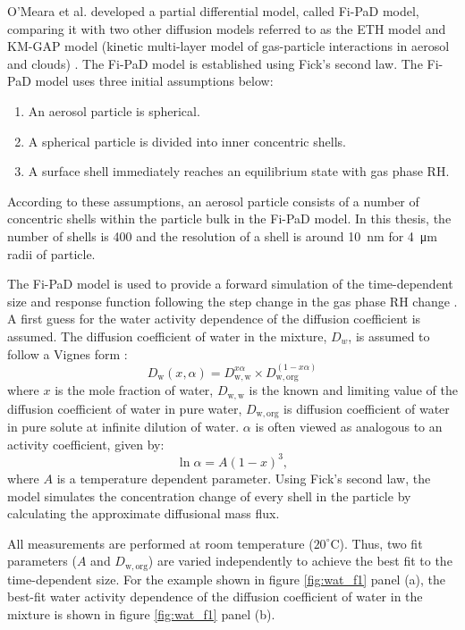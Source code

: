 O’Meara et al. developed a partial differential model, called Fi-PaD model, comparing it with two other diffusion models referred to as the ETH model and KM-GAP model (kinetic multi-layer model of gas-particle interactions in aerosol and clouds) \cite{omearaRateEquilibrationViscous2016}. The Fi-PaD model is established using Fick’s second law. The Fi-PaD model uses three initial assumptions below:
\begin{enumerate}
    \item An aerosol particle is spherical.
    \item A spherical particle is divided into inner concentric shells.
    \item A surface shell immediately reaches an equilibrium state with gas phase RH.
\end{enumerate}
According to these assumptions, an aerosol particle consists of a number of concentric shells within the particle bulk in the Fi-PaD model. In this thesis, the number of shells is \num{400} and the resolution of a shell is around \SI{10}{\nano\meter} for \SI{4}{\micro\meter} radii of particle. 

The Fi-PaD model is used to provide a forward simulation of the time-dependent size and response function following the step change in the gas phase RH change \cite{omearaRateEquilibrationViscous2016,Ingram2017}. A first guess for the water activity dependence of the diffusion coefficient is assumed. The diffusion coefficient of water in the mixture, $D_{w}$, is assumed to follow a Vignes form \cite{omearaRateEquilibrationViscous2016,Ingram2017}:
\begin{equation}\label{eqn:vignes_form}
D_{\mathrm{w}}(x, \alpha)=D_{\mathrm{w, w}}^{x \alpha} \times D_{\mathrm{w}, \mathrm{org}}^{(1-x \alpha)}
\end{equation}
where $x$ is the mole fraction of water, $D_{\mathrm{w, w}}$ is the known and limiting value of the diffusion coefficient of water in pure water, $D_{\mathrm{w}, \mathrm{org}}$ is diffusion coefficient of water in pure solute at infinite dilution of water. $\alpha$ is often viewed as analogous to an activity coefficient, given by:
\begin{equation}
\ln \alpha=A(1-x)^{3},
\end{equation}
where $A$ is a temperature dependent parameter. Using Fick’s second law, the model simulates the concentration change of every shell in the particle by calculating the approximate diffusional mass flux.  

All measurements are performed at room temperature ($\num{20}^{\circ}\mathrm{C}$). Thus, two fit parameters ($A$ and $D_{\mathrm{w,org}}$) are varied independently to achieve the best fit to the time-dependent size. For the example shown in figure \ref{fig:wat_f1} panel (a), the best-fit water activity dependence of the diffusion coefficient of water in the mixture is shown in figure \ref{fig:wat_f1} panel (b). 

